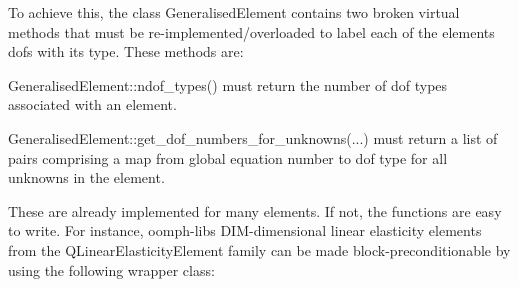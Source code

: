 To achieve this, the class {\ttfamily Generalised\+Element} contains two broken virtual methods that must be re-\/implemented/overloaded to label each of the element\textquotesingle{}s dofs with its type. These methods are\+:


\begin{DoxyItemize}
\item {\ttfamily Generalised\+Element\+::ndof\+\_\+types()} must return the number of dof types associated with an element.
\item {\ttfamily Generalised\+Element\+::get\+\_\+dof\+\_\+numbers\+\_\+for\+\_\+unknowns}(...) must return a list of pairs comprising a map from global equation number to dof type for all unknowns in the element.
\end{DoxyItemize}

These are already implemented for many elements. If not, the functions are easy to write. For instance, {\ttfamily oomph-\/lib\textquotesingle{}s} {\ttfamily D\+IM}-\/dimensional linear elasticity elements from the {\ttfamily Q\+Linear\+Elasticity\+Element} family can be made block-\/preconditionable by using the following wrapper class\+:

